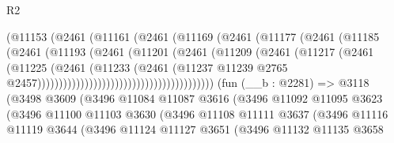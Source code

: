 \begin{lexlean}{R2}
\begin{coremodule}
                                        (@11153
                                          (@2461
                                            (@11161
                                              (@2461
                                                (@11169
                                                  (@2461
                                                    (@11177
                                                      (@2461
                                                        (@11185
                                                          (@2461
                                                            (@11193
                                                              (@2461
                                                                (@11201
                                                                  (@2461
                                                                    (@11209
                                                                      (@2461
                                                                        (@11217
                                                                          (@2461
                                                                            (@11225
                                                                              (@2461
                                                                                (@11233
                                                                                  (@2461
                                                                                    (@11237
                                                                                      @11239
                                                                                      @2765
                                                                                      @2457)))))))))))))))))))))))))))))))))))))))))
    (fun (__b : @2281) =>
    @3118
      (@3498
        @3609
        (@3496
          @11084
          @11087
          @3616
          (@3496
            @11092
            @11095
            @3623
            (@3496
              @11100
              @11103
              @3630
              (@3496
                @11108
                @11111
                @3637
                (@3496
                  @11116
                  @11119
                  @3644
                  (@3496
                    @11124
                    @11127
                    @3651
                    (@3496
                      @11132
                      @11135
                      @3658

\end{coremodule}
\end{lexlean}
